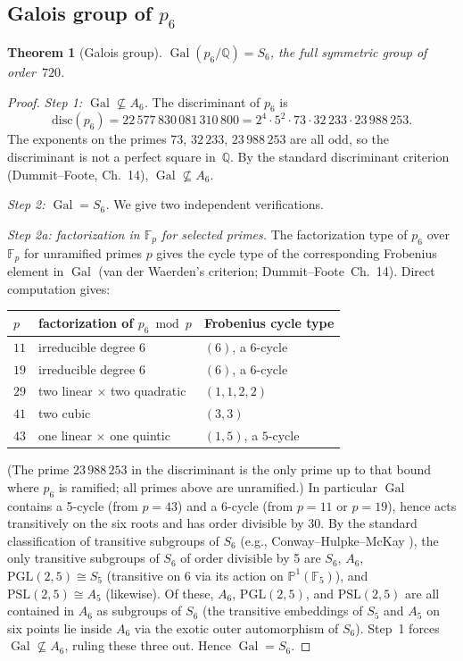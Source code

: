\documentclass[11pt]{article}
\newtheorem{theorem}{Theorem}[section]
\theoremstyle{definition}
\newcommand{\Q}{\mathbb{Q}}
\newcommand{\F}{\mathbb{F}}
\newcommand{\Gal}{\operatorname{Gal}}
\begin{document}
\subsection{Galois group of $p_6$}

\begin{theorem}[Galois group]\label{thm:galois}
$\Gal(p_6/\Q)=S_6$, the full symmetric group of order~$720$.
\end{theorem}

\begin{proof}
\emph{Step 1: $\Gal\not\subseteq A_6$.}  The discriminant of $p_6$ is
\[
\mathrm{disc}(p_6)=22\,577\,830\,081\,310\,800
=2^4\cdot 5^2\cdot 73\cdot 32\,233\cdot 23\,988\,253.
\]
The exponents on the primes $73$, $32\,233$, $23\,988\,253$ are all
odd, so the discriminant is not a perfect square in~$\Q$.  By the
standard discriminant criterion (Dummit--Foote, Ch.~14),
$\Gal\not\subseteq A_6$.

\emph{Step 2: $\Gal=S_6$.}  We give two independent verifications.

\emph{Step 2a: factorization in $\F_p$ for selected primes.}  The
factorization type of $p_6$ over $\F_p$ for unramified primes $p$
gives the cycle type of the corresponding Frobenius element in $\Gal$
\textup{(}van der Waerden's criterion; Dummit--Foote~Ch.~14\textup{)}.
Direct computation gives:
\begin{center}
\begin{tabular}{lll}
\toprule
$p$ & factorization of $p_6 \bmod p$ & Frobenius cycle type \\
\midrule
$11$ & irreducible degree $6$ & $(6)$, a $6$-cycle \\
$19$ & irreducible degree $6$ & $(6)$, a $6$-cycle \\
$29$ & two linear $\times$ two quadratic & $(1,1,2,2)$ \\
$41$ & two cubic & $(3,3)$ \\
$43$ & one linear $\times$ one quintic & $(1,5)$, a $5$-cycle \\
\bottomrule
\end{tabular}
\end{center}
\textup{(}The prime $23\,988\,253$ in the discriminant is the only
prime up to that bound where $p_6$ is ramified; all primes above are
unramified.\textup{)}  In particular $\Gal$ contains a 5-cycle
\textup{(}from $p=43$\textup{)} and a 6-cycle \textup{(}from $p=11$ or
$p=19$\textup{)}, hence acts transitively on the six roots and has
order divisible by 30.  By the standard classification of transitive
subgroups of $S_6$ \textup{(}e.g., Conway--Hulpke--McKay
\cite{ConwayHulpke}\textup{)}, the only transitive subgroups of $S_6$
of order divisible by 5 are $S_6$, $A_6$, $\mathrm{PGL}(2,5)\cong S_5$
\textup{(}transitive on $6$ via its action on $\mathbb{P}^1(\F_5)$\textup{)},
and $\mathrm{PSL}(2,5)\cong A_5$ \textup{(}likewise\textup{)}.  Of these,
$A_6$, $\mathrm{PGL}(2,5)$, and $\mathrm{PSL}(2,5)$ are all contained
in $A_6$ as subgroups of $S_6$ \textup{(}the transitive embeddings of
$S_5$ and $A_5$ on six points lie inside $A_6$ via the exotic outer
automorphism of $S_6$\textup{)}.  Step~1 forces $\Gal\not\subseteq A_6$,
ruling these three out.  Hence $\Gal = S_6$.


\end{proof}
\end{document}
